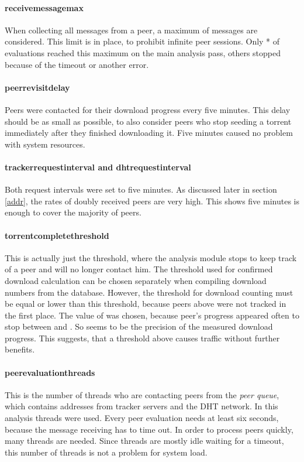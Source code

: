 \documentclass[10pt, a4paper, twoside=false, headsepline]{scrbook}
\renewcommand{\_}{\origunderscore\allowbreak}
\begin{document}
\paragraph{receive\_message\_max}
When collecting all messages from a peer, a maximum of  messages are considered. This limit is in place, to prohibit infinite peer sessions. Only * of evaluations reached this maximum on the main analysis pass, others stopped because of the timeout or another error.

\paragraph{peer\_revisit\_delay}
Peers were contacted for their download progress every five minutes. This delay should be as small as possible, to also consider peers who stop seeding a torrent immediately after they finished downloading it. Five minutes caused no problem with system resources.

\paragraph{tracker\_request\_interval and dht\_request\_interval}
Both request intervals were set to five minutes. As discussed later in section \ref{addr}, the rates of doubly received peers are very high. This shows five minutes is enough to cover the majority of peers.

\paragraph{torrent\_complete\_threshold}
This is actually just the threshold, where the analysis module stops to keep track of a peer and will no longer contact him. The threshold used for confirmed download calculation can be chosen separately when compiling download numbers from the database. However, the threshold for download counting must be equal or lower than this threshold, because peers above were not tracked in the first place. The value of  was chosen, because peer's progress appeared often to stop between  and . So  seems to be the precision of the measured download progress. This suggests, that a threshold above  causes traffic without further benefits.

\paragraph{peer\_evaluation\_threads}
This is the number of threads who are contacting peers from the \emph{peer queue}, which contains addresses from tracker servers and the DHT network. In this analysis  threads were used. Every peer evaluation needs at least six seconds, because the message receiving has to time out. In order to process peers quickly, many threads are needed. Since threads are mostly idle waiting for a timeout, this number of threads is not a problem for system load.
\end{document}
